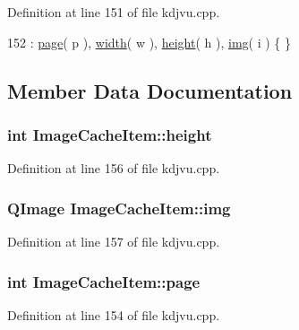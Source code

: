 Definition at line 151 of file kdjvu.\+cpp.


\begin{DoxyCode}
152           : \hyperlink{classImageCacheItem_aa3d72c87b3f029cc5b284f68a48252c6}{page}( p ), \hyperlink{classImageCacheItem_a1481bdd684cf00f3f895302ad8b65720}{width}( w ), \hyperlink{classImageCacheItem_a5b8016e759dfeab649311a6af44f6c34}{height}( h ), \hyperlink{classImageCacheItem_a4c12636231b58e37862371b73eceef9a}{img}( i ) \{ \}
\end{DoxyCode}


\subsection{Member Data Documentation}
\hypertarget{classImageCacheItem_a5b8016e759dfeab649311a6af44f6c34}{
\subsubsection[{height}]{\setlength{\rightskip}{0pt plus 5cm}int Image\+Cache\+Item\+::height}}\label{classImageCacheItem_a5b8016e759dfeab649311a6af44f6c34}


Definition at line 156 of file kdjvu.\+cpp.

\hypertarget{classImageCacheItem_a4c12636231b58e37862371b73eceef9a}{
\subsubsection[{img}]{\setlength{\rightskip}{0pt plus 5cm}Q\+Image Image\+Cache\+Item\+::img}}\label{classImageCacheItem_a4c12636231b58e37862371b73eceef9a}


Definition at line 157 of file kdjvu.\+cpp.

\hypertarget{classImageCacheItem_aa3d72c87b3f029cc5b284f68a48252c6}{
\subsubsection[{page}]{\setlength{\rightskip}{0pt plus 5cm}int Image\+Cache\+Item\+::page}}\label{classImageCacheItem_aa3d72c87b3f029cc5b284f68a48252c6}


Definition at line 154 of file kdjvu.\+cpp.

